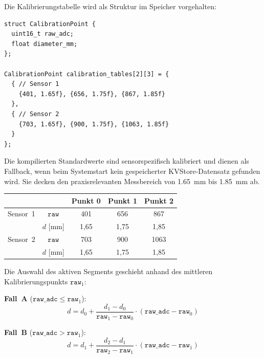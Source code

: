 Die Kalibrierungstabelle wird als Struktur im Speicher vorgehalten:
\begin{lstlisting}[style=firmwarestyle, caption={Kalibrierdatenstruktur mit sensorspezifischen Standardwerten (\texttt{main.cpp}, Z.~89--101).}, label={lst:sensor_cal_table}]
struct CalibrationPoint {
  uint16_t raw_adc;
  float diameter_mm;
};

CalibrationPoint calibration_tables[2][3] = {
  { // Sensor 1
    {401, 1.65f}, {656, 1.75f}, {867, 1.85f}
  },
  { // Sensor 2
    {703, 1.65f}, {900, 1.75f}, {1063, 1.85f}
  }
};
\end{lstlisting}

Die kompilierten Standardwerte sind sensorspezifisch kalibriert und dienen als Fallback, wenn beim Systemstart kein gespeicherter KVStore-Datensatz gefunden wird.
Sie decken den praxisrelevanten Messbereich von \qty{1,65}{\milli\meter} bis \qty{1,85}{\milli\meter} ab.

\begin{center}
  \begin{tabular}{l c c c c}
    \toprule
    & & Punkt 0 & Punkt 1 & Punkt 2 \\
    \midrule
    Sensor~1 & $\mathtt{raw}$ & 401 & 656 & 867 \\
             & $d$ [\unit{\milli\meter}] & 1{,}65 & 1{,}75 & 1{,}85 \\
    \midrule
    Sensor~2 & $\mathtt{raw}$ & 703 & 900 & 1063 \\
             & $d$ [\unit{\milli\meter}] & 1{,}65 & 1{,}75 & 1{,}85 \\
    \bottomrule
  \end{tabular}
\end{center}


Die Auswahl des aktiven Segments geschieht anhand des mittleren Kalibrierungspunkts $\mathtt{raw}_1$:

\textbf{Fall~A} ($\mathtt{raw\_adc} \leq \mathtt{raw}_1$):
\begin{equation}
  d = d_0 + \frac{d_1 - d_0}{\mathtt{raw}_1 - \mathtt{raw}_0} \cdot (\mathtt{raw\_adc} - \mathtt{raw}_0)
  \label{eq:sensor_interp_a}
\end{equation}

\textbf{Fall~B} ($\mathtt{raw\_adc} > \mathtt{raw}_1$):
\begin{equation}
  d = d_1 + \frac{d_2 - d_1}{\mathtt{raw}_2 - \mathtt{raw}_1} \cdot (\mathtt{raw\_adc} - \mathtt{raw}_1)
  \label{eq:sensor_interp_b}
\end{equation}

